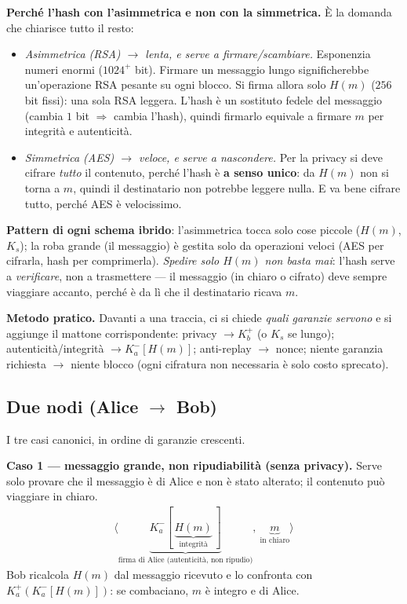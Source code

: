 \documentclass[11pt,a4paper]{report}
\begin{document}
\medskip
\noindent\textbf{Perché l'hash con l'asimmetrica e non con la simmetrica.} È la
domanda che chiarisce tutto il resto:
\begin{itemize}[noitemsep]
\item \emph{Asimmetrica (RSA) $\to$ lenta, e serve a firmare/scambiare.} Esponenzia
numeri enormi ($1024^+$ bit). Firmare un messaggio lungo significherebbe
un'operazione RSA pesante su ogni blocco. Si firma allora solo $H(m)$ ($256$ bit
fissi): una sola RSA leggera. L'hash è un sostituto fedele del messaggio (cambia
$1$ bit $\Rightarrow$ cambia l'hash), quindi firmarlo equivale a firmare $m$ per
integrità e autenticità.
\item \emph{Simmetrica (AES) $\to$ veloce, e serve a nascondere.} Per la privacy
si deve cifrare \emph{tutto} il contenuto, perché l'hash è \textbf{a senso unico}:
da $H(m)$ non si torna a $m$, quindi il destinatario non potrebbe leggere nulla.
E va bene cifrare tutto, perché AES è velocissimo.
\end{itemize}
\textbf{Pattern di ogni schema ibrido}: l'asimmetrica tocca solo cose piccole
($H(m)$, $K_s$); la roba grande (il messaggio) è gestita solo da operazioni veloci
(AES per cifrarla, hash per comprimerla). \emph{Spedire solo $H(m)$ non basta mai}:
l'hash serve a \emph{verificare}, non a trasmettere --- il messaggio (in chiaro o
cifrato) deve sempre viaggiare accanto, perché è da lì che il destinatario ricava
$m$.

\medskip
\noindent\textbf{Metodo pratico.} Davanti a una traccia, ci si chiede \emph{quali
garanzie servono} e si aggiunge il mattone corrispondente:
privacy $\to K_b^+$ (o $K_s$ se lungo); autenticità/integrità $\to K_a^-[H(m)]$;
anti-replay $\to$ nonce; niente garanzia richiesta $\to$ niente blocco (ogni
cifratura non necessaria è solo costo sprecato).

\subsection{Due nodi (Alice $\to$ Bob)}

I tre casi canonici, in ordine di garanzie crescenti.

\medskip
\noindent\textbf{Caso 1 --- messaggio grande, non ripudiabilità (senza privacy).}
Serve solo provare che il messaggio è di Alice e non è stato alterato; il
contenuto può viaggiare in chiaro.
\begin{align*}
  \langle \underbrace{K_a^-[\,\underbrace{H(m)}_\text{integrità}\,]}_\text{firma di Alice (autenticità, non ripudio)},\ \underbrace{m}_\text{in chiaro} \rangle
\end{align*}
Bob ricalcola $H(m)$ dal messaggio ricevuto e lo confronta con
$K_a^+(K_a^-[H(m)])$: se combaciano, $m$ è integro e di Alice.
\end{document}
